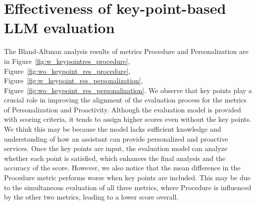 \documentclass[11pt]{article}
\begin{document}
\section{Effectiveness of key-point-based LLM evaluation}

\label{sec:appendix_effectiveness_of_key-point-based_LLM_evaluation}
The Bland-Altman analysis results of metrics Procedure and Personalization are in Figure~\ref{fig:w_keypointres_procedure}, Figure~\ref{fig:wo_keypoint_res_procedure}, Figure~\ref{fig:w_keypoint_res_personalization}, Figure~\ref{fig:wo_keypoint_res_personalization}. We observe that key points play a crucial role in improving the alignment of the evaluation process for the metrics of Personalization and Proactivity. Although the evaluation model is provided with scoring criteria, it tends to assign higher scores even without the key points. We think this may be because the model lacks sufficient knowledge and understanding of how an assistant can provide personalized and proactive services. Once the key points are input, the evaluation model can analyze whether each point is satisfied, which enhances the final analysis and the accuracy of the score. However, we also notice that the mean difference in the Procedure metric performs worse when key points are included. This may be due to the simultaneous evaluation of all three metrics, where Procedure is influenced by the other two metrics, leading to a lower score overall.
\end{document}
